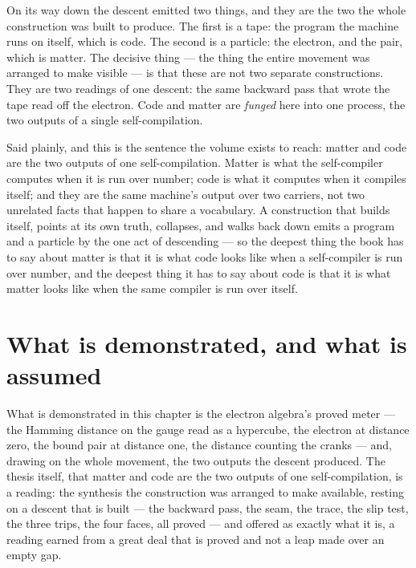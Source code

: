 On its way down the descent emitted two things, and they are the two the whole construction was built to
produce. The first is a tape: the program the machine runs on itself, which is code. The second is a
particle: the electron, and the pair, which is matter. The decisive thing --- the thing the entire movement
was arranged to make visible --- is that these are not two separate constructions. They are two readings of
one descent: the same backward pass that wrote the tape read off the electron. Code and matter are
\emph{funged} here into one process, the two outputs of a single self-compilation.

Said plainly, and this is the sentence the volume exists to reach: matter and code are the two outputs of one
self-compilation. Matter is what the self-compiler computes when it is run over number; code is what it
computes when it compiles itself; and they are the same machine's output over two carriers, not two unrelated
facts that happen to share a vocabulary. A construction that builds itself, points at its own truth,
collapses, and walks back down emits a program and a particle by the one act of descending --- so the
deepest thing the book has to say about matter is that it is what code looks like when a self-compiler is run
over number, and the deepest thing it has to say about code is that it is what matter looks like when the
same compiler is run over itself.

\section{What is demonstrated, and what is assumed}
\label{se:demonstrated-assumed-III7}

What is demonstrated in this chapter is the electron algebra's proved meter --- the Hamming distance on the
gauge read as a hypercube, the electron at distance zero, the bound pair at distance one, the distance
counting the cranks --- and, drawing on the whole movement, the two outputs the descent produced. The thesis
itself, that matter and code are the two outputs of one self-compilation, is a reading: the synthesis the
construction was arranged to make available, resting on a descent that is built --- the backward pass, the
seam, the trace, the slip test, the three trips, the four faces, all proved --- and offered as exactly what
it is, a reading earned from a great deal that is proved and not a leap made over an empty gap.

